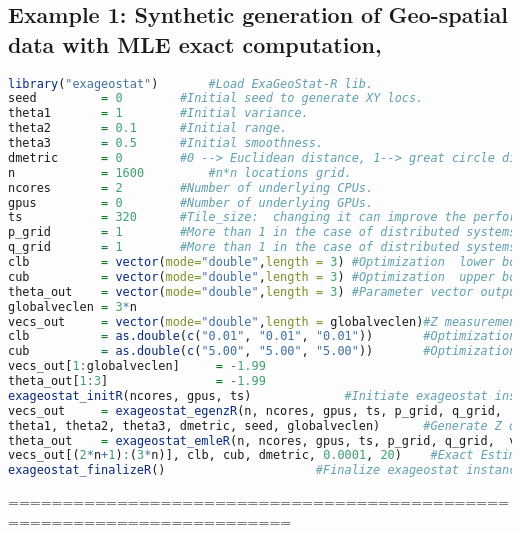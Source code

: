 \documentclass[
10pt, %
a4paper, %
oneside, %
headinclude,footinclude, %
BCOR5mm, %
]{scrartcl}
\begin{document}
\subsection{Example 1: Synthetic generation of Geo-spatial data with MLE exact computation,}
\begin{lstlisting}[language=R]
library("exageostat") 		#Load ExaGeoStat-R lib.
seed         = 0 		#Initial seed to generate XY locs.
theta1       = 1 		#Initial variance.
theta2       = 0.1 		#Initial range.
theta3       = 0.5 		#Initial smoothness.
dmetric      = 0 		#0 --> Euclidean distance, 1--> great circle distance.
n            = 1600 		#n*n locations grid.
ncores       = 2 		#Number of underlying CPUs.
gpus         = 0 		#Number of underlying GPUs.
ts           = 320 		#Tile_size:  changing it can improve the performance. 
p_grid       = 1 		#More than 1 in the case of distributed systems.
q_grid       = 1 		#More than 1 in the case of distributed systems.
clb          = vector(mode="double",length = 3) #Optimization  lower bounds values.
cub          = vector(mode="double",length = 3) #Optimization  upper bounds values.
theta_out    = vector(mode="double",length = 3) #Parameter vector output.
globalveclen = 3*n
vecs_out     = vector(mode="double",length = globalveclen)#Z measurements of n locations.
clb          = as.double(c("0.01", "0.01", "0.01")) 	  #Optimization lower bounds.
cub          = as.double(c("5.00", "5.00", "5.00"))  	  #Optimization upper bounds.
vecs_out[1:globalveclen]     = -1.99
theta_out[1:3]               = -1.99
exageostat_initR(ncores, gpus, ts) 			   #Initiate exageostat instance.
vecs_out     = exageostat_egenzR(n, ncores, gpus, ts, p_grid, q_grid,
theta1, theta2, theta3, dmetric, seed, globalveclen) 	  #Generate Z observation vector.
theta_out    = exageostat_emleR(n, ncores, gpus, ts, p_grid, q_grid,  vecs_out[1:n],  vecs_out[n+1:(2*n)],
vecs_out[(2*n+1):(3*n)], clb, cub, dmetric, 0.0001, 20)    #Exact Estimation (MLE).
exageostat_finalizeR() 					   #Finalize exageostat instance
\end{lstlisting}

========================================================================
\end{document}
